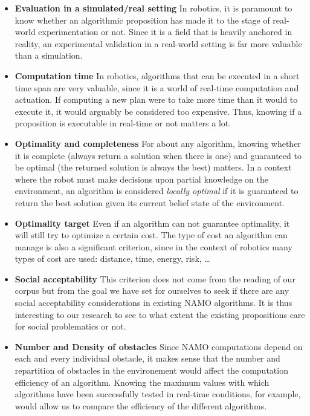 \begin{itemize}
  \item \textbf{Evaluation in a simulated/real setting} In robotics, it is paramount to know whether an algorithmic proposition has made it to the stage of real-world experimentation or not. Since it is a field that is heavily anchored in reality, an experimental validation in a real-world setting is far more valuable than a simulation.
  \item \textbf{Computation time} In robotics, algorithms that can be executed in a short time span are very valuable, since it is a world of real-time computation and actuation. If computing a new plan were to take more time than it would to execute it, it would arguably be considered too expensive. Thus, knowing if a proposition is executable in real-time or not matters a lot.
  \item \textbf{Optimality and completeness} For about any algorithm, knowing whether it is complete (always return a solution when there is one) and guaranteed to be optimal (the returned solution is always the best) matters. In a context where the robot must make decisions upon partial knowledge on the environment, an algorithm is considered \textit{locally optimal} if it is guaranteed to return the best solution given its current belief state of the environment.
  \item \textbf{Optimality target} Even if an algorithm can not guarantee optimality, it will still try to optimize a certain cost. The type of cost an algorithm can manage is also a significant criterion, since in the context of robotics many types of cost are used: distance, time, energy, risk, \dots
  \item \textbf{Social acceptability} This criterion does not come from the reading of our corpus but from the goal we have set for ourselves to seek if there are any social acceptability considerations in existing NAMO algorithms. It is thus interesting to our research to see to what extent the existing propositions care for social problematics or not.
  \item \textbf{Number and Density of obstacles} Since NAMO computations depend on each and every individual obstacle, it makes sense that the number and repartition of obstacles in the environement would affect the computation efficiency of an algorithm. Knowing the maximum values with which algorithms have been successfully tested in real-time conditions, for example, would allow us to compare the efficiency of the different algorithms.
\end{itemize}

